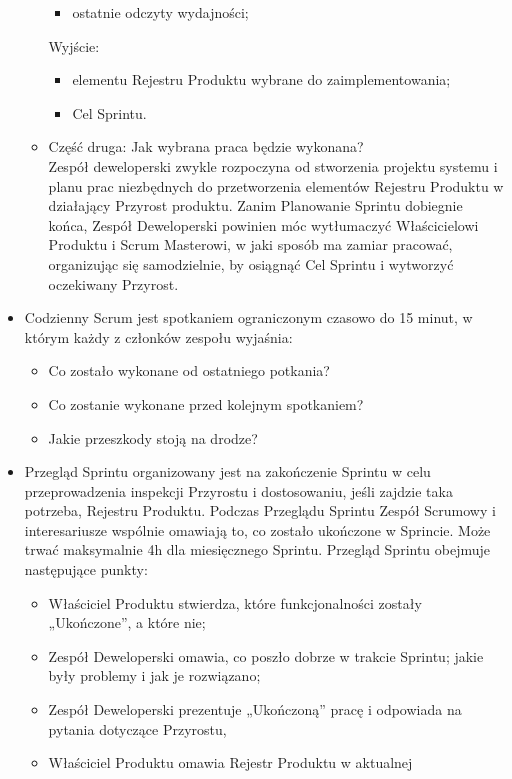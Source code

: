 \documentclass[a4paper]{article}
\begin{document}
\begin{itemize}
\begin{itemize}
\begin{itemize}
    \item ostatnie odczyty wydajności;
\end{itemize}
Wyjście:
\begin{itemize}
    \item elementu Rejestru Produktu
wybrane do zaimplementowania;
    \item Cel Sprintu.
\end{itemize}
        \item Część druga: Jak wybrana praca będzie wykonana?\\
Zespół deweloperski zwykle rozpoczyna od stworzenia projektu
systemu i planu prac niezbędnych do przetworzenia
elementów Rejestru Produktu w działający Przyrost produktu.
Zanim Planowanie Sprintu dobiegnie końca, Zespół
Deweloperski powinien móc wytłumaczyć Właścicielowi
Produktu i Scrum Masterowi, w jaki sposób ma zamiar
pracować, organizując się samodzielnie, by osiągnąć Cel
Sprintu i wytworzyć oczekiwany Przyrost.
    \end{itemize}
    \item Codzienny Scrum jest spotkaniem ograniczonym
czasowo do 15 minut, w którym każdy z
członków zespołu wyjaśnia:
    \begin{itemize}
        \item Co zostało wykonane od ostatniego potkania?
        \item Co zostanie wykonane przed kolejnym spotkaniem?
        \item Jakie przeszkody stoją na drodze?
    \end{itemize}
    \item Przegląd Sprintu organizowany jest na zakończenie
Sprintu w celu przeprowadzenia inspekcji
Przyrostu i dostosowaniu, jeśli zajdzie taka
potrzeba, Rejestru Produktu.
Podczas Przeglądu Sprintu Zespół Scrumowy i
interesariusze wspólnie omawiają to, co zostało
ukończone w Sprincie.
Może trwać maksymalnie 4h dla miesięcznego
Sprintu.
Przegląd Sprintu obejmuje następujące punkty:
    \begin{itemize}
        \item Właściciel Produktu stwierdza, które funkcjonalności zostały
„Ukończone”, a które nie;
        \item Zespół Deweloperski omawia, co poszło dobrze w trakcie
Sprintu; jakie były problemy i jak je rozwiązano;
        \item Zespół Deweloperski prezentuje „Ukończoną” pracę i
odpowiada na pytania dotyczące Przyrostu,
        \item Właściciel Produktu omawia Rejestr Produktu w aktualnej

\end{itemize}
\end{itemize}
\end{document}
